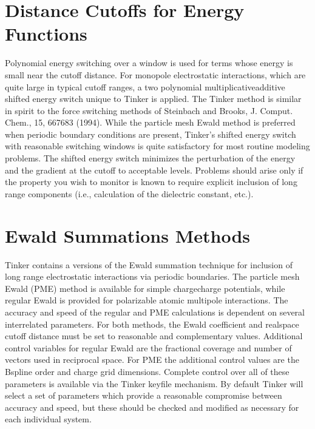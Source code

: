 \documentclass[letterpaper,11pt,english]{sphinxmanual}
\begin{document}
\section{Distance Cutoffs for Energy Functions}
\label{\detokenize{text/special-features:distance-cutoffs-for-energy-functions}}
Polynomial energy switching over a window is used for terms whose energy is small near the cutoff distance. For monopole electrostatic interactions, which are quite large in typical cutoff ranges, a two polynomial multiplicative\sphinxhyphen{}additive shifted energy switch unique to Tinker is applied. The Tinker method is similar in spirit to the force switching methods of Steinbach and Brooks, J. Comput. Chem., 15, 667\sphinxhyphen{}683 (1994). While the particle mesh Ewald method is preferred when periodic boundary conditions are present, Tinker’s shifted energy switch with reasonable switching windows is quite satisfactory for most routine modeling problems. The shifted energy switch minimizes the perturbation of the energy and the gradient at the cutoff to acceptable levels. Problems should arise only if the property you wish to monitor is known to require explicit inclusion of long range components (i.e., calculation of the dielectric constant, etc.).


\section{Ewald Summations Methods}
\label{\detokenize{text/special-features:ewald-summations-methods}}
Tinker contains a versions of the Ewald summation technique for inclusion of long range electrostatic interactions via periodic boundaries. The particle mesh Ewald (PME) method is available for simple charge\sphinxhyphen{}charge potentials, while regular Ewald is provided for polarizable atomic multipole interactions. The accuracy and speed of the regular and PME calculations is dependent on several interrelated parameters. For both methods, the Ewald coefficient and real\sphinxhyphen{}space cutoff distance must be set to reasonable and complementary values. Additional control variables for regular Ewald are the fractional coverage and number of vectors used in reciprocal space. For PME the additional control values are the B\sphinxhyphen{}spline order and charge grid dimensions. Complete control over all of these parameters is available via the Tinker keyfile mechanism. By default Tinker will select a set of parameters which provide a reasonable compromise between accuracy and speed, but these should be checked and modified as necessary for each individual system.
\end{document}
